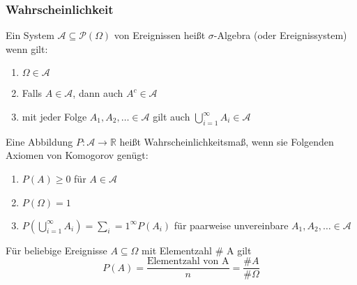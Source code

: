 \documentclass[
	ngerman,
	accentcolor=9c,%
	type=intern,
	marginpar=false
	]{tudapub}
\begin{document}
            \subsubsection{Wahrscheinlichkeit}
                \setcounter{satz}{3}
                \begin{definition}
                    Ein System $\mathscr{A} \subseteq \mathscr{P}(\Omega)$ von Ereignissen heißt $\sigma$-Algebra (oder Ereignissystem) wenn gilt:
                    \begin{enumerate}[label=\alph*)]
                        \item $\Omega \in \mathscr{A}$
                        \item Falls $A \in \mathscr{A}$, dann auch $A^c \in \mathscr{A}$
                        \item mit jeder Folge $A_1, A_2, \dots \in \mathscr{A}$ gilt auch $\bigcup^\infty_{i=1}A_i \in \mathscr{A}$
                    \end{enumerate}
                \end{definition}
                \setcounter{satz}{5}
                \begin{definition}
                    Eine Abbildung $P:\mathscr{A} \rightarrow \mathbb{R}$ heißt Wahrscheinlichkeitsmaß, wenn sie Folgenden Axiomen von Komogorov genügt:
                    \begin{enumerate}[label=\alph*)]
                        \item $P(A) \geq 0$ für $A \in \mathscr{A}$
                        \item $P(\Omega) = 1$
                        \item $P \left(\bigcup^\infty_{i=1}A_i\right)=\sum_i=1^\infty P(A_i)$ für paarweise unvereinbare $A_1,A_2, \dots \in \mathscr{A}$
                    \end{enumerate}
                \end{definition}

                Für beliebige Ereignisse $A \subseteq \Omega$ mit Elementzahl \# A gilt
                \begin{equation*}
                    P(A)= \dfrac{\text{Elementzahl von A}}{n} = \frac{\#A}{\#\Omega}
                \end{equation*}
\end{document}

